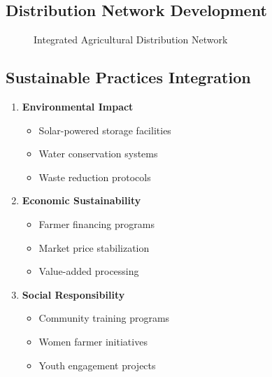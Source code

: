 \subsection{Distribution Network Development}
\begin{figure}[h]
    \centering
    \caption{Integrated Agricultural Distribution Network}
\end{figure}

\subsection{Sustainable Practices Integration}\label{subsec:sustainable-practices-integration}
\begin{tcolorbox}[colback=white,colframe=primary,title=\textbf{Sustainability Framework}]
\begin{enumerate}
    \item \textbf{Environmental Impact}
    \begin{itemize}
        \item Solar-powered storage facilities
        \item Water conservation systems
        \item Waste reduction protocols
    \end{itemize}

    \item \textbf{Economic Sustainability}
    \begin{itemize}
        \item Farmer financing programs
        \item Market price stabilization
        \item Value-added processing
    \end{itemize}

    \item \textbf{Social Responsibility}
    \begin{itemize}
        \item Community training programs
        \item Women farmer initiatives
        \item Youth engagement projects
    \end{itemize}
\end{enumerate}
\end{tcolorbox}


